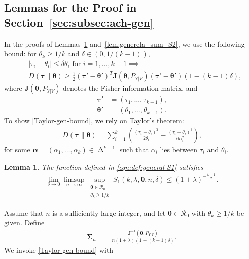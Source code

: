\documentclass[journal, 10pt]{IEEEtran}
\newcommand{\bfJ}{\mathbf{J}}
\newcommand{\cR}{\mathcal{R}}
\theoremstyle{plain}
\theoremstyle{plain}
\newtheorem{lem}{Lemma}%
\theoremstyle{plain}
\theoremstyle{plain}
\newcommand{\boldtheta}{\mathbold{\theta}}
\newcommand{\boldtau}{\mathbold{\tau}}
\newcommand{\boldalpha}{\mathbold{\alpha}}
\newcommand{\simplex}{\operatorname{\Delta}}
\begin{document}
\begin{appendices}
\section{Lemmas for the Proof in Section~\ref{sec:subsec:ach-gen}} \label{appdx:achievability_k>2}
In the proofs of Lemmas~\ref{lem:generela_sum_S1} and~\ref{lem:generela_sum_S2}, we use the following bound: for $\theta_k \ge 1/k $ and $\delta\in (0, 1/(k-1)) $, 
\begin{align}
&|\tau_i-\theta_i|\le \delta \theta_i \text{ for } i=1, \hdots, k-1 \implies  \nonumber \\ & D(\boldtau\| \boldtheta) \ge 
\frac{1}{2}(\boldtau'-\boldtheta')^{T}\bfJ(\boldtheta, P_{Y|V})(\boldtau'-\boldtheta')(1-(k-1)\delta)\text{,} \label{Taylor-gen-bound}
\end{align}
where $\bfJ(\boldtheta, P_{Y|V} ) $ denotes the Fisher information matrix, and 
\begin{align}
\boldtau'&=(\tau_1, \hdots, \tau_{k-1})\text{,} \\
\boldtheta'&=(\theta_1, \hdots, \theta_{k-1})\text{.}
\end{align}
To show \eqref{Taylor-gen-bound}, we rely on Taylor's theorem:
\begin{align}
D(\boldtau\|\boldtheta)=\sum_{i=1}^{k}\left( \frac{(\tau_i-\theta_i)^2}{2\theta_i}-\frac{(\tau_i-\theta_i)^3}{6\alpha_i^2} \right)\text{,} \label{Taylor-gen-eql}
\end{align}
for some $\boldalpha=(\alpha_1, \hdots, \alpha_k)\in \simplex^{k-1} $ such that $\alpha_i$ lies between $\tau_i $ and $\theta_i $.
%
\begin{lem} \label{lem:generela_sum_S1}
The function defined in \eqref{eqn:def:general-S1} satisfies
\begin{align}
\lim_{\delta \to 0}\limsup_{n\to \infty} \sup_{\substack{\boldtheta \in \cR_0 \\ \theta_k \ge 1/k}} S_1(k, \lambda, \boldtheta,n,\delta)  \le (1+\lambda)^{-\frac{k-1}{2}}\text{.} \label{eqn:lem:general-S1}
\end{align}
\end{lem}
\begin{IEEEproof}
Assume that $n$ is a sufficiently large integer, and let $\boldtheta\in \cR_0$ with $\theta_k \ge 1/k$ be given. Define
\begin{align}
\mathbold{\Sigma}_n&=\frac{\bfJ^{-1}(\boldtheta, P_{Y|V})}{n(1+\lambda)(1-(k-1)\delta)}\text{.}
\end{align}
We invoke \eqref{Taylor-gen-bound} with
\begin{align}

\end{align}
\end{IEEEproof}
\end{appendices}
\end{document}
